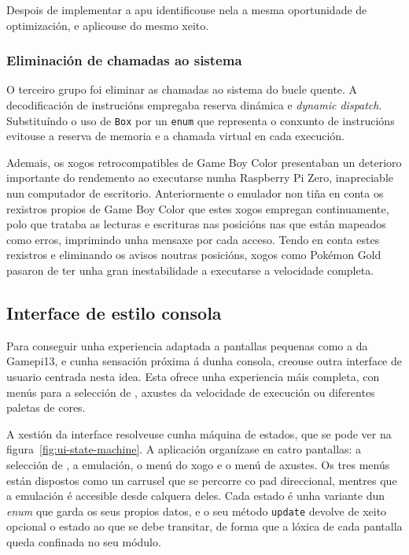 Despois de implementar a \acrshort{apu} identificouse nela a mesma oportunidade de optimización, e aplicouse do mesmo xeito.

\subsubsection{Eliminación de chamadas ao sistema}
O terceiro grupo foi eliminar as chamadas ao sistema do bucle quente.
A decodificación de instrucións empregaba reserva dinámica e \textit{dynamic dispatch}.
Substituíndo o uso de \texttt{Box} por un \texttt{enum} que representa o conxunto de instrucións evitouse a reserva de memoria e a chamada virtual en cada execución.

Ademais, os xogos retrocompatibles de Game Boy Color presentaban un deterioro importante do rendemento ao executarse nunha Raspberry Pi Zero,
inapreciable nun computador de escritorio.
Anteriormente o emulador non tiña en conta os rexistros propios de Game Boy Color que estes xogos empregan continuamente, polo que trataba as lecturas e escrituras
nas posicións nas que están mapeados como erros, imprimindo unha mensaxe por cada acceso.
Tendo en conta estes rexistros e eliminando os avisos noutras posicións, xogos como Pokémon Gold pasaron de ter unha gran inestabilidade a executarse a velocidade completa.



\subsection{Interface de estilo consola}

Para conseguir unha experiencia adaptada a pantallas pequenas como a da Gamepi13, e cunha sensación próxima
á dunha consola, creouse outra interface de usuario centrada nesta idea.
Esta ofrece unha experiencia máis completa, con menús para a selección de , axustes da velocidade de execución ou diferentes paletas de cores.

A xestión da interface resolveuse cunha máquina de estados, que se pode ver na figura~\ref{fig:ui-state-machine}.
A aplicación organízase en catro pantallas: a selección de , a emulación, o menú do xogo e o menú de axustes.
Os tres menús están dispostos como un carrusel que se percorre co pad direccional,
mentres que a emulación é accesible desde calquera deles.
Cada estado é unha variante dun \textit{enum} que garda os seus propios datos,
e o seu método \texttt{update} devolve de xeito opcional o estado ao que se debe transitar,
de forma que a lóxica de cada pantalla queda confinada no seu módulo.

